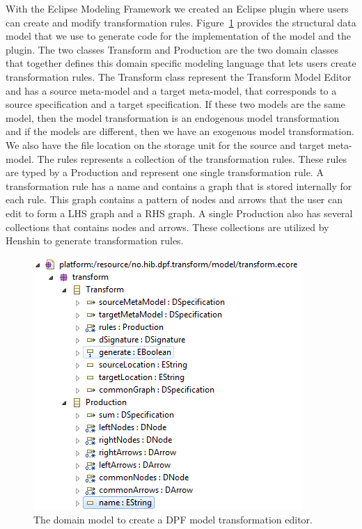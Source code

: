 With the Eclipse Modeling Framework we created an Eclipse plugin where users can
create and modify transformation rules. Figure~\ref{fig:transform_metamodel}
provides the structural data model that we use to generate code for the
implementation of the model and the plugin. The two classes Transform and
Production are the two domain classes that together defines this domain specific
modeling language that lets users create transformation rules. The Transform
class represent the Transform Model Editor and has a source meta-model and a
target meta-model, that corresponds to a source specification and a target
specification. If these two models are the same model, then the model
transformation is an endogenous model transformation and if the models are
different, then we have an exogenous model transformation. We also have the file
location on the storage unit for the source and target meta-model. The rules
represents a collection of the transformation rules. These rules are typed by a
Production and represent one single transformation rule. A transformation
rule has a name and contains a graph that is stored internally for each rule.
This graph contains a pattern of nodes and arrows that the user can edit to
form a LHS graph and a RHS graph. A single Production also has several
collections that contains nodes and arrows. These collections are utilized by
Henshin to generate transformation rules. 

\begin{figure}[H]
	\centering
	\includegraphics[scale=0.8]{./Figures/transform_metamodel.png}
	\caption[Model for the DPF transformation editor]
	{The domain model to create a DPF model transformation editor.}
	\label{fig:transform_metamodel}
\end{figure}

